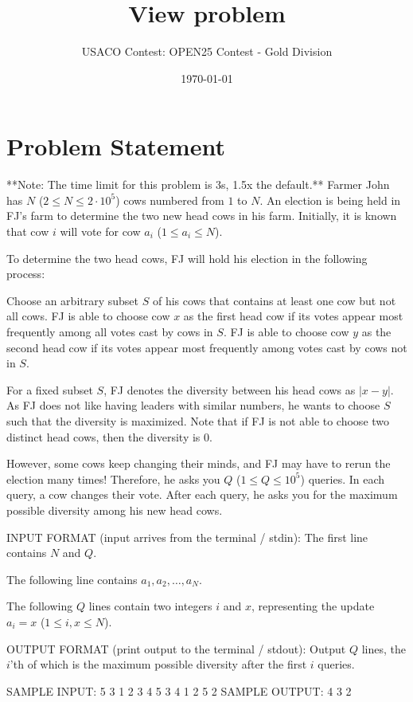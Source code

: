 \documentclass[12pt]{article}
\title{View problem}
\author{USACO Contest: OPEN25 Contest - Gold Division}
\date{\today}
\begin{document}
\maketitle

\section*{Problem Statement}


**Note: The time limit for this problem is 3s, 1.5x the default.**
Farmer John has $N$ ($2 \leq N \leq 2 \cdot 10^5$) cows numbered from $1$ to
$N$. An election is being held in FJ's farm to determine the two new head cows
in his farm. Initially, it is known that cow $i$ will vote for cow $a_i$
($1 \leq a_i \leq N$).

To determine the two head cows, FJ will hold his election in the following
process:

 Choose an arbitrary subset $S$ of his cows that contains at least one cow
but not all cows. FJ is able to choose cow $x$ as the first head cow if its
votes appear most frequently among all votes cast by cows in $S$.
 FJ is able to choose cow $y$ as the second head cow if its votes appear
most frequently among votes cast by cows not in $S$.

For a fixed subset $S$, FJ denotes the  diversity  between his head cows
as $|x - y|$. As FJ does not like having leaders with similar numbers, he  wants
to choose $S$ such that the  diversity  is maximized. Note that if FJ is
not able to choose two distinct head cows, then the diversity is $0$.

However, some cows keep changing their minds, and FJ may have to rerun the
election many times! Therefore, he asks you $Q$ ($1 \leq Q \leq 10^5$) queries.
In each query, a cow changes their vote. After each query, he asks you for the
maximum possible diversity among his new head cows. 

INPUT FORMAT (input arrives from the terminal / stdin):
The first line contains $N$ and $Q$.

The following line contains $a_1, a_2, \ldots, a_N$.

The following $Q$ lines contain two integers $i$ and $x$, representing the
update $a_i = x$ ($1 \leq i, x \leq N$).

OUTPUT FORMAT (print output to the terminal / stdout):
Output $Q$ lines, the $i$'th of which is the maximum possible  diversity 
after the first $i$ queries.

SAMPLE INPUT:
5 3
1 2 3 4 5
3 4
1 2
5 2
SAMPLE OUTPUT: 
4
3
2
\end{document}
